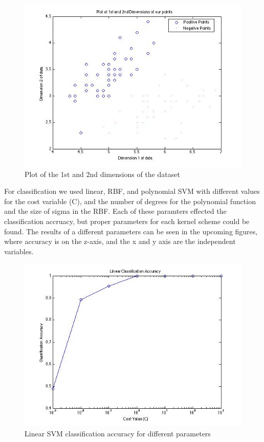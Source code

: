 \documentclass[paper=a4, fontsize=11pt]{scrartcl} %
\begin{document}
\begin{figure}[h]
\centering
\includegraphics[scale=0.4]{serperability.jpg}
\caption{Plot of the 1st and 2nd dimensions of the dataset}
\label{fig:plot_2d}
\end{figure}

For classification we used linear, RBF, and polynomial SVM with different values for the cost variable (C), and the number of degrees for the polynomial function and the size of sigma in the RBF.
Each of these paramters effected the classification accruacy, but proper parameters for each kernel scheme could be found.
The results of a different parameters can be seen in the upcoming figures, where accuracy is on the z-axis, and the x and y axis are the independent variables.

\begin{figure}
\centering
\includegraphics[scale=0.4]{linear.jpg}
\caption{Linear SVM classification accuracy for different parameters}
\label{fig:plot_2d}
\end{figure}
\end{document}
